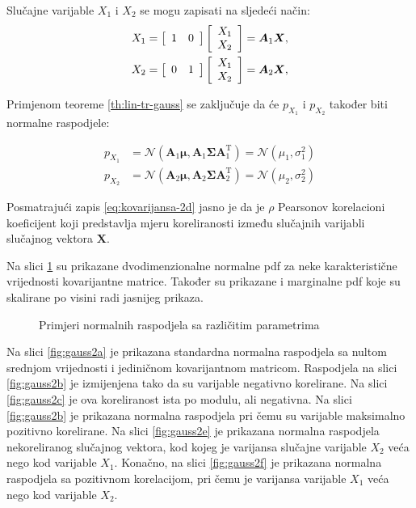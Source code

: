 Slučajne varijable $X_1$ i $X_2$ se mogu zapisati na sljedeći način:
\begin{eqnarray}
	X_1 = \left[\begin{array}{cc}1&0\end{array}\right] \left[\begin{array}{c}X_1\\X_2\end{array}\right] = \bm A_1 \bm X,
	\\
	X_2 = \left[\begin{array}{cc}0&1\end{array}\right] \left[\begin{array}{c}X_1\\X_2\end{array}\right] = \bm A_2 \bm X,
\end{eqnarray}

Primjenom teoreme \ref{th:lin-tr-gauss} se zaključuje da će $p_{X_1}$ i
$p_{X_2}$ također biti normalne raspodjele:

\begin{align*}
	p_{X_1} &= \mathcal{N}(\bm A_1\bm\mu, \bm A_1 \bm\Sigma \bm A_1^\mathrm T)
		= \mathcal{N}(\mu_1, \sigma_1^2) \\
	p_{X_2} &= \mathcal{N}(\bm A_2\bm\mu, \bm A_2 \bm\Sigma \bm A_2^\mathrm T)
		= \mathcal{N}(\mu_2, \sigma_2^2)
\end{align*}

Posmatrajući zapis \eqref{eq:kovarijansa-2d} jasno je da je $\rho$ Pearsonov
korelacioni koeficijent koji predstavlja mjeru koreliranosti između slučajnih
varijabli slučajnog vektora $\bm X$.

Na slici \ref{fig:gauss2} su prikazane dvodimenzionalne normalne pdf za neke
karakteristične vrijednosti kovarijantne matrice. Također su prikazane i
marginalne pdf koje su skalirane po visini radi jasnijeg prikaza.

\begin{figure}[H]
  \centering
	\caption{Primjeri normalnih raspodjela sa različitim parametrima}
	\label{fig:gauss2}
\end{figure}

Na slici \ref{fig:gauss2a} je prikazana standardna normalna raspodjela sa nultom
srednjom vrijednosti i jediničnom kovarijantnom matricom. Raspodjela na slici
\ref{fig:gauss2b} je izmijenjena tako da su varijable negativno korelirane. Na
slici \ref{fig:gauss2c} je ova koreliranost ista po modulu, ali negativna. Na
slici \ref{fig:gauss2b} je prikazana normalna raspodjela pri čemu su varijable
maksimalno pozitivno korelirane. Na slici \ref{fig:gauss2e} je prikazana
normalna raspodjela nekoreliranog slučajnog vektora, kod kojeg je varijansa
slučajne varijable $X_2$ veća nego kod varijable $X_1$. Konačno, na slici
\ref{fig:gauss2f} je prikazana normalna raspodjela sa pozitivnom korelacijom,
pri čemu je varijansa varijable $X_1$ veća nego kod varijable $X_2$.\\

